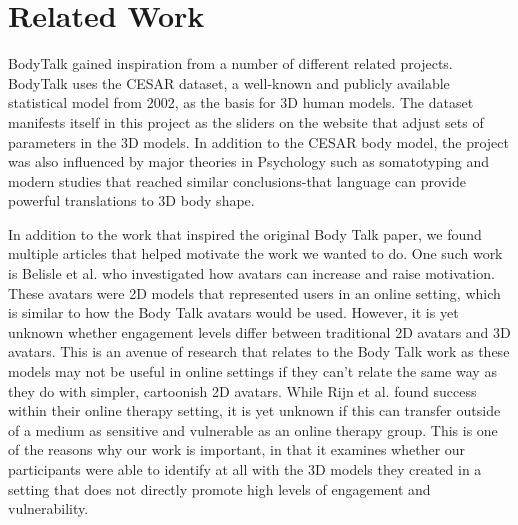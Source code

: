 \documentclass[journal]{vgtc}                %
\begin{document}
\section{Related Work}
\noindent BodyTalk gained inspiration from a number of different related projects. BodyTalk uses the CESAR dataset, a well-known and publicly available statistical model from 2002, as the basis for 3D human models. The dataset manifests itself in this project as the sliders on the website that adjust sets of parameters in the 3D models. In addition to the CESAR body model, the project was also influenced by major theories in Psychology such as somatotyping and modern studies that reached similar conclusions-that language can provide powerful translations to 3D body shape.

\noindent In addition to the work that inspired the original Body Talk paper, we found multiple articles that helped motivate the work
we wanted to do. One such work is Belisle et al. who investigated how avatars can increase and raise motivation\cite{Belisle:2010:PM}.
These avatars were 2D models that represented users in an online setting, which is similar to how the Body Talk avatars would be used.
However, it is yet unknown whether engagement levels differ between traditional 2D avatars and 3D avatars. This is an avenue of research
that relates to the Body Talk work as these models may not be useful in online settings if they can't relate the same way as they
do with simpler, cartoonish 2D avatars. While Rijn et al. found success within their online therapy setting, it is yet
unknown if this can transfer outside of a medium as sensitive and vulnerable as an online therapy group\cite{Rijn:2015:BJGC}.
This is one of the reasons why our work is important, in that it examines whether
our participants were able to identify at all with the 3D models they created in a setting that does not directly promote
high levels of engagement and vulnerability.
\end{document}
